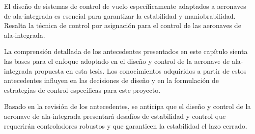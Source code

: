 El diseño de sistemas de control de vuelo específicamente adaptados a aeronaves de ala-integrada es esencial para garantizar la estabilidad y maniobrabilidad. Resalta la técnica de control por asignación para el control de las aeronaves de ala-integrada. 

La comprensión detallada de los antecedentes presentados en este capítulo sienta las bases para el enfoque adoptado en el diseño y control de la aeronave de ala-integrada propuesta en esta tesis. Los conocimientos adquiridos a partir de estos antecedentes influyen en las decisiones de diseño y en la formulación de estrategias de control específicas para este proyecto.

Basado en la revisión de los antecedentes, se anticipa que el diseño y control de la aeronave de ala-integrada presentará desafíos de estabilidad y control que requerirán controladores robustos y que garanticen la estabilidad el lazo cerrado. 


%



